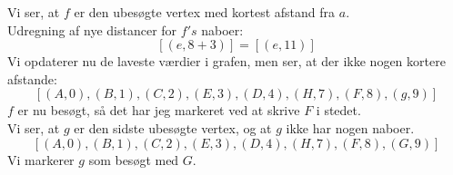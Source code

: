 \documentclass[a4paper,12pt]{article}
\begin{document}
Vi ser, at $f$ er den ubesøgte vertex med kortest afstand fra $a$.\\
Udregning af nye distancer for $f's$ naboer:
\[
[(e,8+3)] = [(e,11)]
\]
Vi opdaterer nu de laveste værdier i grafen, men ser, at der ikke nogen kortere afstande:
\[
[(A,0),(B,1),(C,2),(E,3),(D,4),(H,7),(F,8),(g,9)]
\]
$f$ er nu besøgt, så det har jeg markeret ved at skrive $F$ i stedet.\\

Vi ser, at $g$ er den sidste ubesøgte vertex, og at $g$ ikke har nogen naboer.\\
\[
[(A,0),(B,1),(C,2),(E,3),(D,4),(H,7),(F,8),(G,9)]
\]
Vi markerer $g$ som besøgt med $G$.

\subsection[]{}



\subsection[]{}



\subsection[]{}
\end{document}
